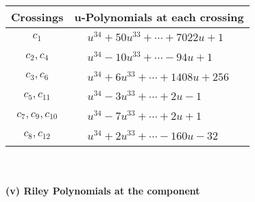 \documentclass[1p]{elsarticle_modified}
\theoremstyle{definition}
\begin{document}
\begin{tabular}{m{50pt}|m{274pt}}
Crossings & \hspace{64pt}u-Polynomials at each crossing \\
\hline $$\begin{aligned}c_{1}\end{aligned}$$&$\begin{aligned}
&u^{34}+50 u^{33}+\cdots+7022 u+1
\end{aligned}$\\
\hline $$\begin{aligned}c_{2},c_{4}\end{aligned}$$&$\begin{aligned}
&u^{34}-10 u^{33}+\cdots-94 u+1
\end{aligned}$\\
\hline $$\begin{aligned}c_{3},c_{6}\end{aligned}$$&$\begin{aligned}
&u^{34}+6 u^{33}+\cdots+1408 u+256
\end{aligned}$\\
\hline $$\begin{aligned}c_{5},c_{11}\end{aligned}$$&$\begin{aligned}
&u^{34}-3 u^{33}+\cdots+2 u-1
\end{aligned}$\\
\hline $$\begin{aligned}c_{7},c_{9},c_{10}\end{aligned}$$&$\begin{aligned}
&u^{34}-7 u^{33}+\cdots+2 u+1
\end{aligned}$\\
\hline $$\begin{aligned}c_{8},c_{12}\end{aligned}$$&$\begin{aligned}
&u^{34}+2 u^{33}+\cdots-160 u-32
\end{aligned}$\\
\hline
\end{tabular}\\~\\
\newpage\renewcommand{\arraystretch}{1}
\flushleft \textbf{(v) Riley Polynomials at the component}\newline \\
\end{document}
